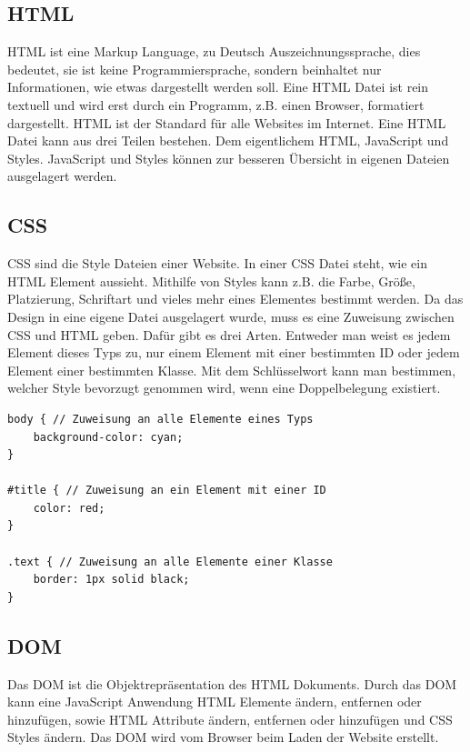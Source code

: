 \subsection{HTML}
\label{sec:vor-html}
\ac{HTML} ist eine Markup Language, zu Deutsch Auszeichnungssprache, dies bedeutet, sie ist keine Programmiersprache, sondern beinhaltet nur Informationen, wie etwas dargestellt werden soll. Eine \ac{HTML} Datei ist rein textuell und wird erst durch ein Programm, z.B. einen Browser, formatiert dargestellt. \ac{HTML} ist der Standard für alle Websites im Internet. Eine \ac{HTML} Datei kann aus drei Teilen bestehen. Dem eigentlichem \ac{HTML}, JavaScript und Styles. JavaScript und Styles können zur besseren Übersicht in eigenen Dateien ausgelagert werden.

\subsection{CSS}
\ac{CSS} sind die Style Dateien einer Website. In einer \ac{CSS} Datei steht, wie ein \ac{HTML} Element aussieht. Mithilfe von Styles kann z.B. die Farbe, Größe, Platzierung, Schriftart und vieles mehr eines Elementes bestimmt werden. Da das Design in eine eigene Datei ausgelagert wurde, muss es eine Zuweisung zwischen \ac{CSS} und \ac{HTML} geben. Dafür gibt es drei Arten. Entweder man weist es jedem Element dieses Typs zu, nur einem Element mit einer bestimmten ID oder jedem Element einer bestimmten Klasse. Mit dem Schlüsselwort  kann man bestimmen, welcher Style bevorzugt genommen wird, wenn eine Doppelbelegung existiert.

\begin{lstlisting}[caption=Zuweisen von Design an HTML,style=css,label=CSS-Beispiel]
body { // Zuweisung an alle Elemente eines Typs
	background-color: cyan;
}

#title { // Zuweisung an ein Element mit einer ID
	color: red;
}

.text { // Zuweisung an alle Elemente einer Klasse
	border: 1px solid black;
}
\end{lstlisting}


\subsection{DOM}
\label{sec:vor-dom}
Das \ac{DOM} ist die Objektrepräsentation des \ac{HTML} Dokuments. Durch das \ac{DOM} kann eine JavaScript Anwendung \ac{HTML} Elemente ändern, entfernen oder hinzufügen, sowie \ac{HTML} Attribute ändern, entfernen oder hinzufügen und \ac{CSS} Styles ändern. Das \ac{DOM} wird vom Browser beim Laden der Website erstellt. 

